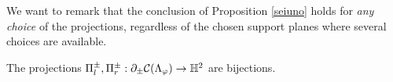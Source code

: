 We want to remark that the conclusion of Proposition \ref{seiuno} holds for \textit{any choice} of the projections, regardless of the chosen support planes where several choices are available.




\begin{proposition}\label{seitre}
    The projections $\Pi_l^\pm, \Pi_r^\pm:\partial_\pm\mathcal{C}(\Lambda_\varphi)\to\mathbb{H}^2$ are bijections. 
\end{proposition}
